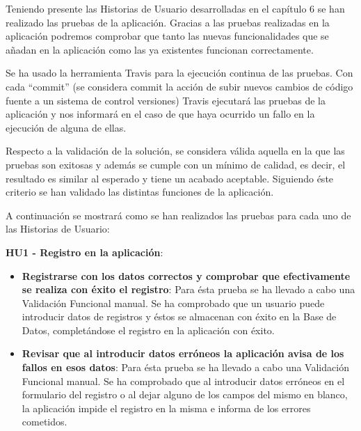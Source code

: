 \documentclass[11pt,openany]{book}
\begin{document}
Teniendo presente las Historias de Usuario desarrolladas en el capítulo 6 se han realizado las pruebas de la aplicación. Gracias a las pruebas realizadas en la aplicación podremos comprobar que tanto las nuevas funcionalidades que se añadan en la aplicación como las ya existentes funcionan correctamente.

Se ha usado la herramienta Travis para la ejecución continua de las pruebas. Con cada ``commit'' (se considera commit la acción de subir nuevos cambios de código fuente a un sistema de control versiones) Travis ejecutará las pruebas de la aplicación y nos informará en el caso de que haya ocurrido un fallo en la ejecución de alguna de ellas.

Respecto a la validación de la solución, se considera válida aquella en la que las pruebas son exitosas y además se cumple con un mínimo de calidad, es decir, el resultado es similar al esperado y tiene un acabado aceptable. Siguiendo éste criterio se han validado las distintas funciones de la aplicación. 

A continuación se mostrará como se han realizados las pruebas para cada uno de las Historias de Usuario:

\pagebreak
\textbf{HU1 - Registro en la aplicación}:

\begin{itemize}
\item\textbf{Registrarse con los datos correctos y comprobar que efectivamente se realiza con éxito el registro}: Para ésta prueba se ha llevado a cabo una Validación Funcional manual. Se ha comprobado que un usuario puede introducir datos de registros y éstos se almacenan con éxito en la Base de Datos, completándose el registro en la aplicación con éxito.
\item\textbf{Revisar que al introducir datos erróneos la aplicación avisa de los fallos en esos datos}: Para ésta prueba se ha llevado a cabo una Validación Funcional manual. Se ha comprobado que al introducir datos erróneos en el formulario del registro o al dejar alguno de los campos del mismo en blanco, la aplicación impide el registro en la misma e informa de los errores cometidos.
\end{itemize}
\end{document}
